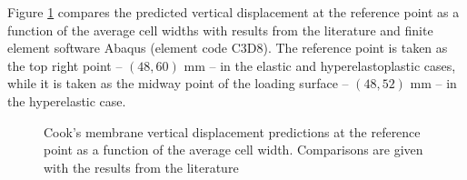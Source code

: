 \documentclass[sn-mathphys,Numbered]{sn-jnl}%
\begin{document}
Figure \ref{fig:cooksMembrane_disp} compares the predicted vertical displacement at the reference point as a function of the average cell widths with results from the literature and finite element software Abaqus (element code C3D8).
The reference point is taken as the top right point -- $(48,60)$ mm -- in the elastic and hyperelastoplastic cases, while it is taken as the midway point of the loading surface -- $(48,52)$ mm -- in the hyperelastic case.
\begin{figure}[htbp]
   \centering
   \caption{Cook's membrane vertical displacement predictions at the reference point as a function of the average cell width. Comparisons are given with the results from the literature \cite{Zienkiewicz2000, Pelteret2018, Simo1992, Simplas}}
   \label{fig:cooksMembrane_disp}
\end{figure}
\end{document}
